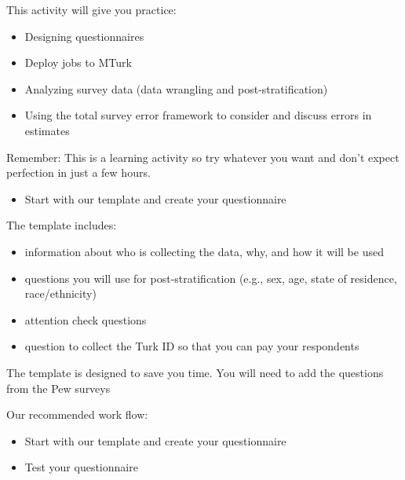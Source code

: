 \documentclass[aspectratio=169]{beamer}
\begin{document}
\begin{frame}

This activity will give you practice:
\begin{itemize}
\item Designing questionnaires
\pause
\item Deploy jobs to MTurk
\pause
\item Analyzing survey data (data wrangling and post-stratification)
\pause
\item Using the total survey error framework to consider and discuss errors in estimates
\pause
\end{itemize}

\vfill
Remember: This is a learning activity so try whatever you want and don't expect perfection in just a few hours.

\end{frame}
\begin{frame}

\begin{itemize}
\item Start with our template and create your questionnaire
\end{itemize}

\end{frame}
\begin{frame}

The template includes:
\begin{itemize}
\item information about who is collecting the data, why, and how it will be used
\pause
\item questions you will use for post-stratification (e.g., sex, age, state of residence, race/ethnicity)
\pause
\item attention check questions
\pause
\item question to collect the Turk ID so that you can pay your respondents
\end{itemize}

\vfill
The template is designed to save you time.  You will need to add the questions from the Pew surveys
\end{frame}
\begin{frame}

Our recommended work flow:
\begin{itemize}
\item Start with our template and create your questionnaire \pause
\item Test your questionnaire
\end{itemize}

\end{frame}
\end{document}
